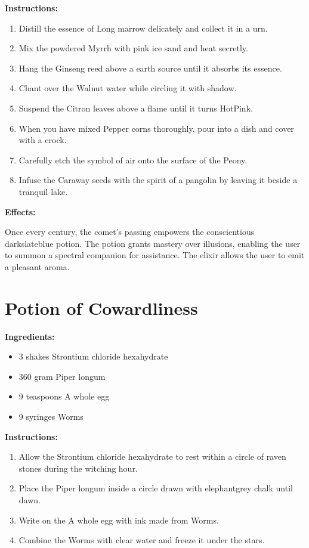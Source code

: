 \documentclass{article}
\begin{document}
\textbf{Instructions:}

\begin{enumerate}
  \item Distill the essence of Long marrow delicately and collect it in a urn.
  \item Mix the powdered Myrrh with pink ice sand and heat secretly.
  \item Hang the Ginseng reed above a earth source until it absorbs its essence.
  \item Chant over the Walnut water while circling it with shadow.
  \item Suspend the Citron leaves above a flame until it turns HotPink.
  \item When you have mixed Pepper corns thoroughly, pour into a dish and cover with a crock.
  \item Carefully etch the symbol of air onto the surface of the Peony.
  \item Infuse the Caraway seeds with the spirit of a pangolin by leaving it beside a tranquil lake.
\end{enumerate}

\textbf{Effects:}

Once every century, the comet’s passing empowers the conscientious darkslateblue potion. The potion grants mastery over illusions, enabling the user to summon a spectral companion for assistance. The elixir allows the user to emit a pleasant aroma.

\newpage
\section*{Potion of Cowardliness}

\textbf{Ingredients:}

\begin{itemize}
  \item 3 shakes Strontium chloride hexahydrate
  \item 360 gram Piper longum
  \item 9 teaspoons A whole egg
  \item 9 syringes Worms
\end{itemize}

\textbf{Instructions:}

\begin{enumerate}
  \item Allow the Strontium chloride hexahydrate to rest within a circle of raven stones during the witching hour.
  \item Place the Piper longum inside a circle drawn with elephantgrey chalk until dawn.
  \item Write on the A whole egg with ink made from Worms.
  \item Combine the Worms with clear water and freeze it under the stars.
\end{enumerate}
\end{document}

